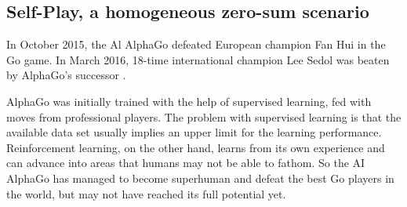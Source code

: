 \subsection{Self-Play, a homogeneous zero-sum scenario}
\label{selfplay}
\begin{comment}

- Dota 2 openai
    - https://openai.com/five/
    - https://openai.com/blog/openai-baselines-ppo/
    
- phan paper training 1 - agents develop motor skills
- \cite{selfplay-heinrich}  many real-world applications are in principle games

- schach?
- go?
- dota?
- physical openai

"if you arent really good - your opponent isnt either. if you are getting better - your opponent gets better" - perfect curriculum

"agent that you train in self play is useful for external task"

https://www.youtube.com/watch?v=BJi6N4tDupk

supervised learning - limited by dataset - creates ceiling of how far it can go
\end{comment}


In October 2015, the Al AlphaGo defeated European champion Fan Hui in the Go game. In March 2016, 18-time international champion Lee Sedol was beaten by AlphaGo's successor \cite{GoalphaGosilver2017mastering}. 

\begin{comment}
AlphaGo was initially trained with the help of supervised learning, fed with moves from professional players. Afterwards policy-gradient reinforcement learning was applied and the value network was taught to determine the winner of games of the policy network against itself. These networks were then combined with Monte-Carlo Tree Search to select the best possible action from the current state \cite{alphaGosilver2017mastering}.
\end{comment}

AlphaGo was initially trained with the help of supervised learning, fed with moves from professional players.
The problem with supervised learning is that the available data set usually implies an upper limit for the learning performance. Reinforcement learning, on the other hand, learns from its own experience and can advance into areas that humans may not be able to fathom. So the AI AlphaGo has managed to become superhuman and defeat the best Go players in the world, but may not have reached its full potential yet.

